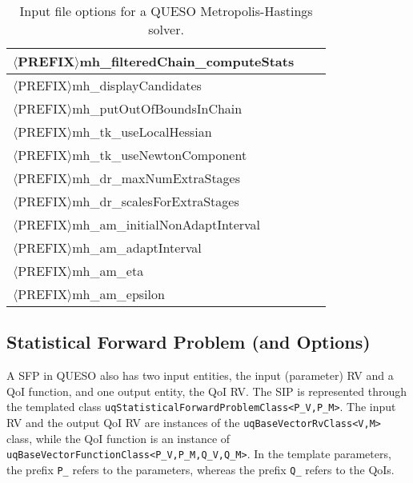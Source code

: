 \begin{table}[!h]
\begin{center}
\begin{tabular}{|l|c|c|}
\hline
$\langle$PREFIX$\rangle$mh\_filteredChain\_computeStats         &         &             \\
\hline
$\langle$PREFIX$\rangle$mh\_displayCandidates                   &         &             \\
\hline
$\langle$PREFIX$\rangle$mh\_putOutOfBoundsInChain               &         &             \\
\hline
$\langle$PREFIX$\rangle$mh\_tk\_useLocalHessian                 &         &             \\
\hline
$\langle$PREFIX$\rangle$mh\_tk\_useNewtonComponent              &         &             \\
\hline
$\langle$PREFIX$\rangle$mh\_dr\_maxNumExtraStages               &         &             \\
\hline
$\langle$PREFIX$\rangle$mh\_dr\_scalesForExtraStages            &         &             \\
\hline
$\langle$PREFIX$\rangle$mh\_am\_initialNonAdaptInterval         &         &             \\
\hline
$\langle$PREFIX$\rangle$mh\_am\_adaptInterval                   &         &             \\
\hline
$\langle$PREFIX$\rangle$mh\_am\_eta                             &         &             \\
\hline
$\langle$PREFIX$\rangle$mh\_am\_epsilon                         &         &             \\
\hline
\end{tabular}
\end{center}
\caption{
Input file options for a QUESO Metropolis-Hastings solver.
}
\label{tab-metropolis-hastings-options}
\end{table}

\subsection{Statistical Forward Problem (and Options)}

A SFP in QUESO also has two input entities, the input (parameter) RV and a QoI function, and one output entity, the QoI RV. 
The SIP is represented through the templated class \verb+uqStatisticalForwardProblemClass<P_V,P_M>+.
The input RV and the output QoI RV are instances of the \verb+uqBaseVectorRvClass<V,M>+ class, while
the QoI function is an instance of \verb+uqBaseVectorFunctionClass<P_V,P_M,Q_V,Q_M>+.
In the template parameters, the prefix \verb+P_+ refers to the parameters, whereas the prefix \verb+Q_+ refers to the QoIs.

